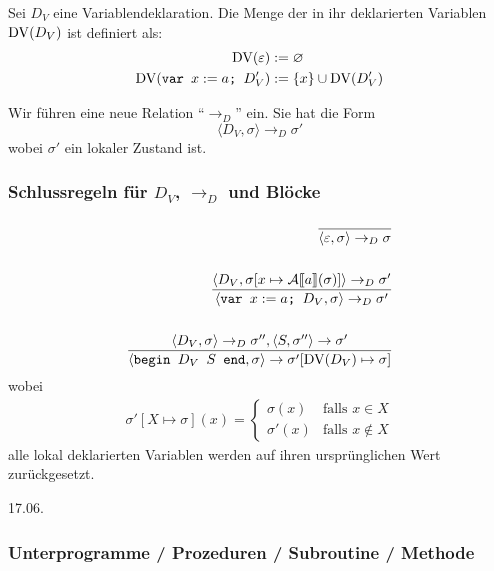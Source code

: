 \begin{lemma}[Determiniertheit]
\begin{definition}
    Sei $D_V$ eine Variablendeklaration. Die Menge der in ihr deklarierten Variablen $\operatorname{DV}(D_V)$ ist definiert als:
    \begin{align*}
        \operatorname{DV}(\varepsilon) & := \varnothing \\
        \operatorname{DV}(\texttt{var } x := a \texttt{; } D_V') & := \{ x \} \cup \operatorname{DV}(D_V')
    \end{align*}

    Wir führen eine neue Relation ``$\to_D$'' ein. Sie hat die Form \[
        \langle D_V, \sigma \rangle \to_D \sigma'
    \]
    wobei $\sigma'$ ein lokaler Zustand ist.
\end{definition}



\subsubsection{Schlussregeln für $D_V$, $\to_D$ und Blöcke}

\begin{align*}
    \frac{}{\langle \varepsilon, \sigma \rangle \to_D \sigma} \\
    \\
    \frac{
        \langle D_V, \sigma[x \mapsto \mathcal{A}\mathrm{[}\kern-.14em\mathrm{[} a\mathrm{]}\kern-.14em\mathrm{]}(\sigma)] \rangle \to_D \sigma'
    }{
        \langle \texttt{var } x := a \texttt{; } D_V, \sigma \rangle \to_D \sigma'
    } \\
    \\
    \frac{
        \langle D_V, \sigma \rangle \to_D \sigma'', \langle S, \sigma'' \rangle \to \sigma'
    }{
        \langle \texttt{begin $D_V$ $S$ end}, \sigma \rangle \to \sigma'[\operatorname{DV}(D_V) \mapsto \sigma]
    }
\end{align*}
wobei
\begin{align*}
    \sigma'[X \mapsto \sigma](x) = \begin{cases}
        \sigma(x) & \text{falls } x \in X \\
        \sigma'(x) & \text{falls } x \not\in X
    \end{cases}
\end{align*}
\dh{} alle lokal deklarierten Variablen werden auf ihren ursprünglichen Wert zurückgesetzt.


\newpage
\hfill 17.06.

\subsubsection{Unterprogramme / Prozeduren / Subroutine / Methode}


\end{lemma}
